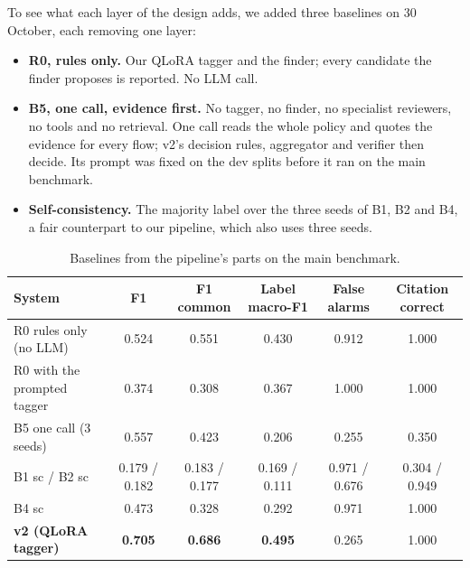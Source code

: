 \documentclass[11pt,a4paper]{article}
\begin{document}
To see what each layer of the design adds, we added three baselines on 30 October, each removing
one layer:
\begin{itemize}
  \item \textbf{R0, rules only.} Our QLoRA tagger and the finder; every candidate the finder
        proposes is reported. No LLM call.
  \item \textbf{B5, one call, evidence first.} No tagger, no finder, no specialist reviewers, no
        tools and no retrieval. One call reads the whole policy and quotes the evidence for every
        flow; v2's decision rules, aggregator and verifier then decide. Its prompt was fixed on the
        dev splits before it ran on the main benchmark.
  \item \textbf{Self-consistency.} The majority label over the three seeds of B1, B2 and B4, a fair
        counterpart to our pipeline, which also uses three seeds.
\end{itemize}

\begin{table}[H]
\centering
\small
\begin{tabular}{lccccc}
\toprule
System & F1 & F1 common & Label macro-F1 & False alarms & Citation correct \\
\midrule
R0 rules only (no LLM) & 0.524 & 0.551 & 0.430 & 0.912 & 1.000 \\
R0 with the prompted tagger & 0.374 & 0.308 & 0.367 & 1.000 & 1.000 \\
B5 one call (3 seeds) & 0.557 & 0.423 & 0.206 & 0.255 & 0.350 \\
B1 sc / B2 sc & 0.179 / 0.182 & 0.183 / 0.177 & 0.169 / 0.111 & 0.971 / 0.676 & 0.304 / 0.949 \\
B4 sc & 0.473 & 0.328 & 0.292 & 0.971 & 1.000 \\
\textbf{v2 (QLoRA tagger)} & \textbf{0.705} & \textbf{0.686} & \textbf{0.495} & 0.265 & 1.000 \\
\bottomrule
\end{tabular}
\caption{Baselines from the pipeline's parts on the main benchmark.}
\end{table}
\end{document}

